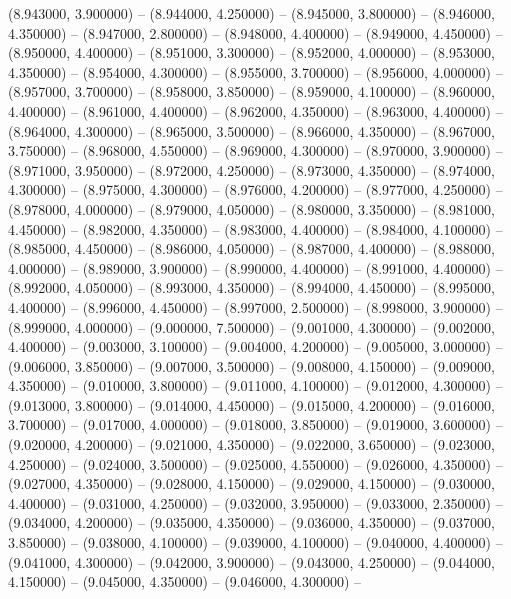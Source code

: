 (8.943000, 3.900000) -- 
(8.944000, 4.250000) -- 
(8.945000, 3.800000) -- 
(8.946000, 4.350000) -- 
(8.947000, 2.800000) -- 
(8.948000, 4.400000) -- 
(8.949000, 4.450000) -- 
(8.950000, 4.400000) -- 
(8.951000, 3.300000) -- 
(8.952000, 4.000000) -- 
(8.953000, 4.350000) -- 
(8.954000, 4.300000) -- 
(8.955000, 3.700000) -- 
(8.956000, 4.000000) -- 
(8.957000, 3.700000) -- 
(8.958000, 3.850000) -- 
(8.959000, 4.100000) -- 
(8.960000, 4.400000) -- 
(8.961000, 4.400000) -- 
(8.962000, 4.350000) -- 
(8.963000, 4.400000) -- 
(8.964000, 4.300000) -- 
(8.965000, 3.500000) -- 
(8.966000, 4.350000) -- 
(8.967000, 3.750000) -- 
(8.968000, 4.550000) -- 
(8.969000, 4.300000) -- 
(8.970000, 3.900000) -- 
(8.971000, 3.950000) -- 
(8.972000, 4.250000) -- 
(8.973000, 4.350000) -- 
(8.974000, 4.300000) -- 
(8.975000, 4.300000) -- 
(8.976000, 4.200000) -- 
(8.977000, 4.250000) -- 
(8.978000, 4.000000) -- 
(8.979000, 4.050000) -- 
(8.980000, 3.350000) -- 
(8.981000, 4.450000) -- 
(8.982000, 4.350000) -- 
(8.983000, 4.400000) -- 
(8.984000, 4.100000) -- 
(8.985000, 4.450000) -- 
(8.986000, 4.050000) -- 
(8.987000, 4.400000) -- 
(8.988000, 4.000000) -- 
(8.989000, 3.900000) -- 
(8.990000, 4.400000) -- 
(8.991000, 4.400000) -- 
(8.992000, 4.050000) -- 
(8.993000, 4.350000) -- 
(8.994000, 4.450000) -- 
(8.995000, 4.400000) -- 
(8.996000, 4.450000) -- 
(8.997000, 2.500000) -- 
(8.998000, 3.900000) -- 
(8.999000, 4.000000) -- 
(9.000000, 7.500000) -- 
(9.001000, 4.300000) -- 
(9.002000, 4.400000) -- 
(9.003000, 3.100000) -- 
(9.004000, 4.200000) -- 
(9.005000, 3.000000) -- 
(9.006000, 3.850000) -- 
(9.007000, 3.500000) -- 
(9.008000, 4.150000) -- 
(9.009000, 4.350000) -- 
(9.010000, 3.800000) -- 
(9.011000, 4.100000) -- 
(9.012000, 4.300000) -- 
(9.013000, 3.800000) -- 
(9.014000, 4.450000) -- 
(9.015000, 4.200000) -- 
(9.016000, 3.700000) -- 
(9.017000, 4.000000) -- 
(9.018000, 3.850000) -- 
(9.019000, 3.600000) -- 
(9.020000, 4.200000) -- 
(9.021000, 4.350000) -- 
(9.022000, 3.650000) -- 
(9.023000, 4.250000) -- 
(9.024000, 3.500000) -- 
(9.025000, 4.550000) -- 
(9.026000, 4.350000) -- 
(9.027000, 4.350000) -- 
(9.028000, 4.150000) -- 
(9.029000, 4.150000) -- 
(9.030000, 4.400000) -- 
(9.031000, 4.250000) -- 
(9.032000, 3.950000) -- 
(9.033000, 2.350000) -- 
(9.034000, 4.200000) -- 
(9.035000, 4.350000) -- 
(9.036000, 4.350000) -- 
(9.037000, 3.850000) -- 
(9.038000, 4.100000) -- 
(9.039000, 4.100000) -- 
(9.040000, 4.400000) -- 
(9.041000, 4.300000) -- 
(9.042000, 3.900000) -- 
(9.043000, 4.250000) -- 
(9.044000, 4.150000) -- 
(9.045000, 4.350000) -- 
(9.046000, 4.300000) -- 
